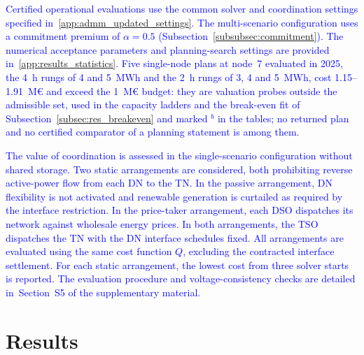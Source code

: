 \documentclass[preprint,12pt]{elsarticle}
\begin{document}
\textcolor{blue}{
    Certified operational evaluations use the common solver and coordination settings specified in~\ref{app:admm_updated_settings}.
    The multi-scenario configuration uses a commitment premium of $\alpha = 0.5$ (Subsection~\ref{subsubsec:commitment}).
    The numerical acceptance parameters and planning-search settings are provided in~\ref{app:results_statistics}.
    Five single-node plans at node~7 evaluated in 2025, the 4~h rungs of 4 and 5~MWh and the 2~h rungs of 3, 4 and 5~MWh, cost 1.15--1.91~M\euro{} and exceed the 1~M\euro{} budget: they are valuation probes outside the admissible set, used in the capacity ladders and the break-even fit of Subsection~\ref{subsec:res_breakeven} and marked $^{b}$ in the tables; no returned plan and no certified comparator of a planning statement is among them.
}

\textcolor{blue}{
    The value of coordination is assessed in the single-scenario configuration without shared storage. Two static arrangements are considered, both prohibiting reverse active-power flow from each DN to the TN. In the passive arrangement, DN flexibility is not activated and renewable generation is curtailed as required by the interface restriction. In the price-taker arrangement, each DSO dispatches its network against wholesale energy prices. In both arrangements, the TSO dispatches the TN with the DN interface schedules fixed.
    All arrangements are evaluated using the same cost function $Q$, excluding the contracted interface settlement. For each static arrangement, the lowest cost from three solver starts is reported. The evaluation procedure and voltage-consistency checks are detailed in~Section~S5 of the supplementary material.
}


\section{Results}
\label{sec:results}
\end{document}
